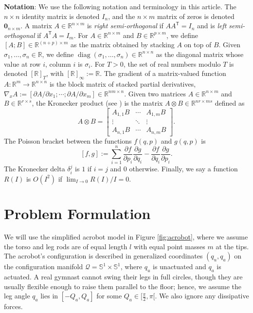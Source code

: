 \documentclass[journal,twoside,web, twocolumn,draftcls]{ieeecolor}
\DeclareMathOperator{\Diag}{diag}
\newcommand*{\diag}[1]{\Diag\left(#1\right)}
\newcommand*{\tpose}{^\mathsf{T}}
\newcommand*{\Rt}[1]{[\R]_{#1}}
\newcommand*{\R}{\mathbb{R}}
\newcommand*{\Sone}{\mathbb{S}^1}
\newcommand*{\Id}[1]{I_{#1}}
\newcommand*{\Zmat}[1]{\bm{0}_{#1}}
\newcommand*{\pdiff}[2]{\frac{\partial #1}{\partial #2}}
\begin{document}
\textbf{Notation}:
We use the following notation and terminology in this article.
The \(n \times n\) identity matrix is denoted \(\Id{n}\), and the \(n \times m\)
matrix of zeros is denoted \(\Zmat{n\times m}\).
A matrix \(A \in \R^{n \times m}\) is \textit{right semi-orthogonal} if
\(A A\tpose = \Id{n}\) and is \textit{left semi-orthogonal} if 
\(A\tpose A = \Id{m}\).
For \(A \in \R^{n\times m}\) and \(B \in \R^{p \times m}\),
we define \([A;B] \in \R^{(n+p)\times m}\) as the matrix obtained by stacking \(A\)
on top of \(B\). 
Given \(\sigma_1,\ldots,\sigma_n \in \R\), we define 
\(\diag{\sigma_1,\ldots,\sigma_n} \in \R^{n \times n}\) as the diagonal matrix
whose value at row \(i\), column \(i\) is \(\sigma_i\).
For \(T > 0\), the set of real numbers modulo \(T\) is denoted \(\Rt{T}\), with
\(\Rt{\infty} := \R\).
The gradient of a matrix-valued function 
\(A : \R^m \rightarrow \R^{n\times n}\) is the block matrix of stacked partial
derivatives, 
\(\nabla_xA := [\partial A/\partial x_1; \cdots; \partial A/\partial x_m] \in
\R^{nm \times n}\).
Given two matrices \(A \in \R^{n \times m}\) and \(B \in \R^{r \times s}\), the
Kronecker product (see \cite{kronprod}) is the matrix  
\(A \otimes B \in \R^{nr \times ms}\)  defined as
\begin{equation}\label{eqn:kronprod}
    A \otimes B = \begin{bmatrix}
        A_{1,1}B & \cdots & A_{1,m} B \\
        \vdots & \ddots & \vdots \\
        A_{n,1} B & \cdots & A_{n,m} B
    \end{bmatrix} 
    .
\end{equation}
The Poisson bracket \cite{landau_mechanics} between the functions
\(f(q,p)\) and \(g(q,p)\) is
\begin{equation}\label{eqn:poisson-bracket}
    [f,g] := \sum \limits_{i=1}^n \pdiff{f}{p_i}\pdiff{g}{q_i} - 
        \pdiff{f}{q_i}\pdiff{g}{p_i}
    .
\end{equation}
The Kronecker delta \(\delta_i^j\) is \(1\) if \(i = j\) and \(0\)
otherwise.
Finally, we say a function \(R(I)\) is \(O(I^2)\)
if \(\lim_{I \to 0} R(I)/I = 0\).

\section{Problem Formulation}\label{sec:problem-formulation}
We will use the simplified acrobot model in Figure
\ref{fig:acrobot}, where we assume the torso and leg rods are of
equal length \(l\) with equal point masses \(m\) at the tips.
The acrobot's configuration is described in generalized coordinates
\((q_u,q_a)\) on the configuration manifold 
\(\mathcal{Q} = \Sone \times \Sone\), where \(q_u\) is unactuated and 
\(q_a\) is actuated.
A real gymnast cannot swing their legs in full circles, though they
are usually flexible enough to raise them parallel to the floor;
hence, we assume the leg angle \(q_a\) lies in \([-Q_a, Q_a]\) for some
\(Q_a \in [\frac{\pi}{2}, \pi[\). 
We also ignore any dissipative forces.
\end{document}

